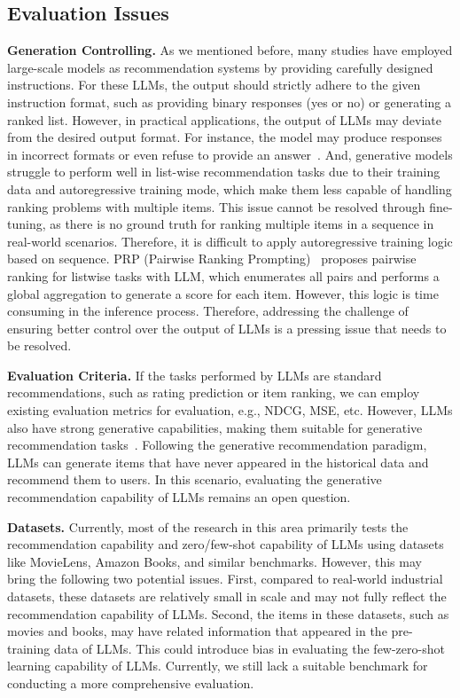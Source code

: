 \documentclass[sn-mathphys-num]{sn-jnl}%
\theoremstyle{thmstyleone}%
\theoremstyle{thmstyletwo}%
\theoremstyle{thmstylethree}%
\begin{document}
\subsection{Evaluation Issues}
\noindent\textbf{Generation Controlling.}
As we mentioned before, many studies have employed large-scale models as recommendation systems by providing carefully designed instructions. For these LLMs, the output should strictly adhere to the given instruction format, such as providing binary responses (yes or no) or generating a ranked list. However, in practical applications, the output of LLMs may deviate from the desired output format. For instance, the model may produce responses in incorrect formats or even refuse to provide an answer~\cite{DBLP:journals/corr/abs-2305-02182}. And, generative models struggle to perform well in list-wise recommendation tasks due to their training data and autoregressive training mode, which make them less capable of handling ranking problems with multiple items. This issue cannot be resolved through fine-tuning, as there is no ground truth for ranking multiple items in a sequence in real-world scenarios. Therefore, it is difficult to apply autoregressive training logic based on sequence. PRP (Pairwise Ranking Prompting)~\cite{qin2023large} proposes pairwise ranking for listwise tasks with LLM, which enumerates all pairs and performs a global aggregation to generate a score for each item. However, this logic is time consuming in the inference process. Therefore, addressing the challenge of ensuring better control over the output of LLMs is a pressing issue that needs to be resolved.

\noindent\textbf{Evaluation Criteria.}
If the tasks performed by LLMs are standard recommendations, such as rating prediction or item ranking, we can employ existing evaluation metrics for evaluation, e.g., NDCG, MSE, etc. However, LLMs also have strong generative capabilities, making them suitable for generative recommendation tasks~\cite{DBLP:journals/corr/abs-2304-03516}. Following the generative recommendation paradigm, LLMs can generate items that have never appeared in the historical data and recommend them to users. In this scenario, evaluating the generative recommendation capability of LLMs remains an open question.


\noindent\textbf{Datasets.}
Currently, most of the research in this area primarily tests the recommendation capability and zero/few-shot capability of LLMs using datasets like MovieLens, Amazon Books, and similar benchmarks. However, this may bring the following two potential issues. First, compared to real-world industrial datasets, these datasets are relatively small in scale and may not fully reflect the recommendation capability of LLMs. Second, the items in these datasets, such as movies and books, may have related information that appeared in the pre-training data of LLMs. This could introduce bias in evaluating the few-zero-shot learning capability of LLMs. Currently, we still lack a suitable benchmark for conducting a more comprehensive evaluation.
\end{document}
